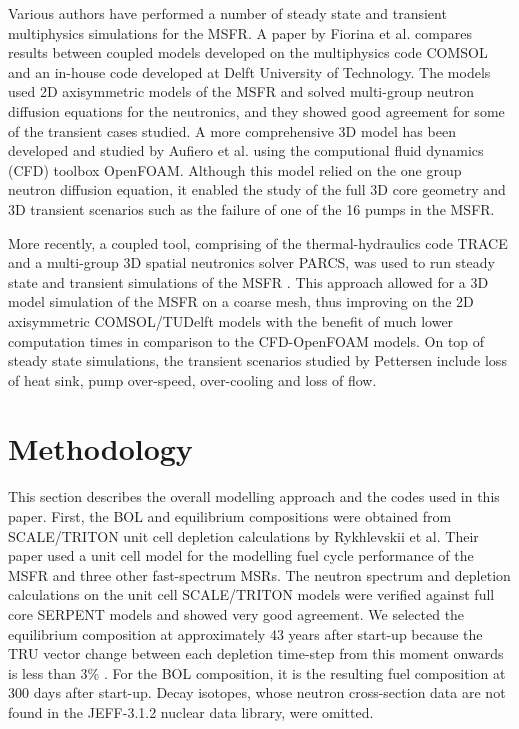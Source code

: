 \documentclass{anstrans}
\begin{document}
	Various authors have performed a number of steady state and transient
	multiphysics simulations for the \gls{MSFR}. A paper by Fiorina et al.
	\cite{fiorina_modelling_2014} compares results between coupled models
	developed on the multiphysics code COMSOL and an in-house code developed at
	Delft University of Technology. The models used 2D axisymmetric models of
	the \gls{MSFR} and solved multi-group neutron diffusion equations for the
	neutronics, and they showed good agreement for some of the transient cases
	studied. A more comprehensive 3D model has been developed and studied by
	Aufiero et al. \cite{aufiero_development_2014} using the computional fluid
	dynamics (CFD) toolbox OpenFOAM. Although this model relied on the one
	group neutron diffusion equation, it enabled the study of the full 3D core
	geometry and 3D transient scenarios such as the failure of one of the 16
	pumps in the \gls{MSFR}.

	More recently, a coupled tool, comprising of the thermal-hydraulics code
	TRACE and a multi-group 3D spatial neutronics solver \gls{PARCS}, was
	used to run steady state and transient simulations of the \gls{MSFR}
	\cite{pettersen_coupled_2016}. This approach allowed for a 3D model
	simulation of the \gls{MSFR} on a coarse mesh, thus improving on the 2D
	axisymmetric COMSOL/TUDelft models with the benefit of much lower
	computation times in comparison to the CFD-OpenFOAM models. On top of
	steady state simulations, the transient scenarios studied by Pettersen
	\cite{pettersen_coupled_2016} include loss of heat sink, pump over-speed,
	over-cooling and loss of flow.

\section{Methodology}

	This section describes the overall modelling approach and the codes used
	in this paper. First, the \gls{BOL} and equilibrium compositions were
	obtained from SCALE/TRITON unit cell depletion calculations by Rykhlevskii
	et al. \cite{rykhlevskii_fuel_2019} Their paper used a unit cell model for
	the modelling
	fuel cycle performance of the \gls{MSFR} and three other fast-spectrum
	\glspl{MSR}. The neutron spectrum and depletion calculations on the unit
	cell SCALE/TRITON models were verified against full core SERPENT models and
	showed very good agreement. We selected the equilibrium composition at
	approximately 43 years after start-up because the TRU vector change
	between each depletion time-step from this moment onwards is less than 3\%
	\cite{rykhlevskii_fuel_2019}. For the \gls{BOL} composition, it is the 
	resulting fuel composition at
	300 days after start-up. Decay isotopes, whose neutron cross-section data
	are not found in the
	JEFF-3.1.2 nuclear data library, were omitted.
	
\end{document}
